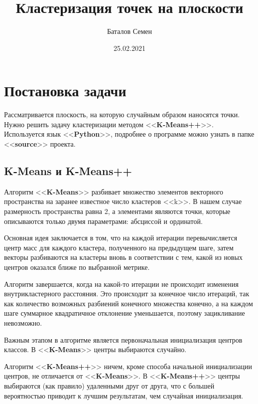 \documentclass[12pt, a4paper]{article}
\title{Кластеризация точек на плоскости}
\author{Баталов Семен}
\date{25.02.2021}
\begin{document}
    
    \sloppy
    
    \maketitle
    
    \section{Постановка задачи}
    
    Рассматривается плоскость, на которую случайным образом наносятся точки. 
    Нужно решить задачу кластеризации методом <<\textbf{K-Means++}>>. 
    Используется язык <<\textbf{Python}>>, подробнее о программе можно узнать в 
    папке <<\textbf{source}>> проекта.
    
    \subsection{K-Means и K-Means++}
    
    Алгоритм <<\textbf{K-Means}>> разбивает множество элементов векторного 
    пространства на заранее известное число кластеров <<k>>. В нашем случае 
    размерность пространства равна 2, а элементами являются точки, которые 
    описываются только двумя параметрами: абсциссой и ординатой.
    
    Основная идея заключается в том, что на каждой итерации перевычисляется центр 
    масс для каждого кластера, полученного на предыдущем шаге, затем векторы 
    разбиваются на кластеры вновь в соответствии с тем, какой из новых центров 
    оказался ближе по выбранной метрике.
    
    Алгоритм завершается, когда на какой-то итерации не происходит изменения 
    внутрикластерного расстояния. Это происходит за конечное число итераций, так 
    как количество возможных разбиений конечного множества конечно, а на каждом 
    шаге суммарное квадратичное отклонение уменьшается, поэтому зацикливание 
    невозможно.
    
    Важным этапом в алгоритме является первоначальная инициализация центров 
    классов. В <<\textbf{K-Means}>> центры выбираются случайно.
    
    Алгоритм <<\textbf{K-Means++}>> ничем, кроме способа начальной инициализации 
    центров, не отличается от <<\textbf{K-Means}>>. В <<\textbf{K-Means++}>> 
    центры выбираются (как правило) удаленными друг от друга, что с большей 
    вероятностью приводит к лучшим результатам, чем случайная инициализация.
    
\end{document}
